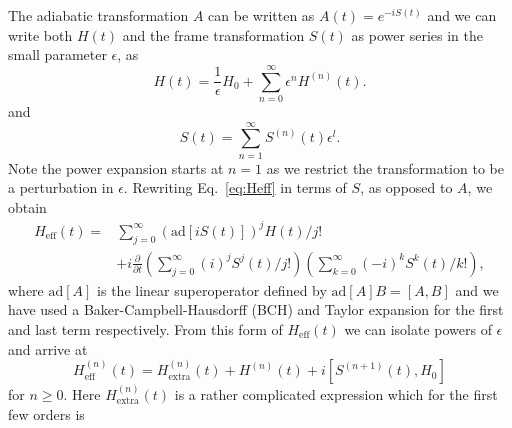 \documentclass[pra,twocolumn,floatfix,superscriptaddress,eqsecnum]{revtex4-1}
\newcommand{\be}{\begin{equation}}
\newcommand{\ee}{\end{equation}}
\begin{document}
The adiabatic transformation $A$ can be written as $A(t) = e^{-i S(t)}$ and we can write both $H(t)$ and the frame transformation $S(t)$ as power series in the small parameter $\epsilon$, as
\begin{equation}
 H(t) = \frac{1}{\epsilon}H_0+\sum_{n=0}^{\infty} \epsilon^n  H^{(n)}(t).
\end{equation} and
\be
S(t) = \sum_{n=1}^{\infty} S^{(n)}(t) \epsilon^l.
\ee Note the power expansion starts at $n=1$ as we restrict the transformation to be a perturbation in $\epsilon$.
Rewriting Eq.~\eqref{eq:Heff} in terms of $S$, as opposed to $A$, we obtain
\begin{equation}
\begin{split}
H_\mathrm{eff}(t) =& \sum_{j=0}^{\infty} \left( \textrm{ad}[i S(t)] \right)^j H(t) /j! \\
 &+ i \frac{\partial}{\partial t} \left(\sum_{j=0}^\infty  (i)^j S^j(t)/j! \right) \left(\sum_{k=0}^\infty (-i)^k S^k(t)/k! \right),
\end{split}
\end{equation}
where $\textrm{ad}[A]$ is the linear superoperator defined by $\textrm{ad}[A] B = [A,B] $ and we have used a Baker-Campbell-Hausdorff (BCH) and Taylor expansion for the first and last term respectively.  From this form of $H_\mathrm{eff}(t)$ we can isolate powers of $\epsilon$ and arrive at
\begin{equation}\label{eq:rec}
H_\mathrm{eff}^{(n)}(t)=H_\mathrm{extra}^{(n)}(t)+H^{(n)}(t) + i [S^{(n+1)}(t),H_0]
\end{equation} for $n\geq0$. Here $H_\mathrm{extra}^{(n)}(t)$ is a rather complicated expression which for the first few orders is
\end{document}
